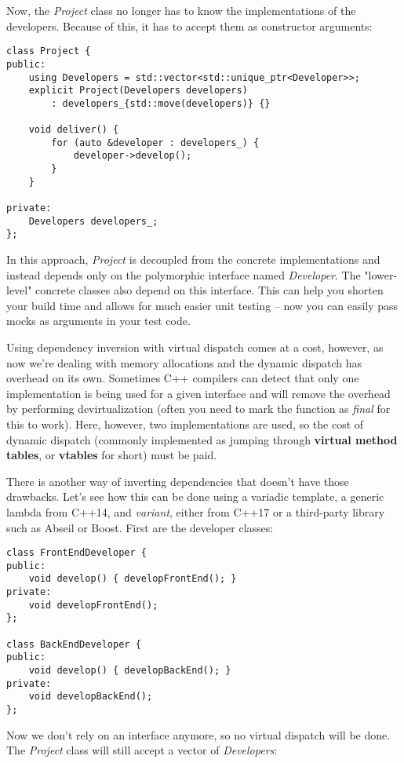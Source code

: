Now, the \textit{Project} class no longer has to know the implementations of the developers. Because of this, it has to accept them as constructor arguments:


\begin{lstlisting}[style=styleCXX]
class Project {
public:
	using Developers = std::vector<std::unique_ptr<Developer>>;
	explicit Project(Developers developers)
		: developers_{std::move(developers)} {}
		
	void deliver() {
		for (auto &developer : developers_) {
			developer->develop();
		}
	}

private:
	Developers developers_;
};
\end{lstlisting}

In this approach, \textit{Project} is decoupled from the concrete implementations and instead depends only on the polymorphic interface named \textit{Developer}. The "lower-level" concrete classes also depend on this interface. This can help you shorten your build time and allows for much easier unit testing – now you can easily pass mocks as arguments in your test code.

Using dependency inversion with virtual dispatch comes at a cost, however, as now we're dealing with memory allocations and the dynamic dispatch has overhead on its own. Sometimes C++ compilers can detect that only one implementation is being used for a given interface and will remove the overhead by performing devirtualization (often you need to mark the function as \textit{final} for this to work). Here, however, two implementations are used, so the cost of dynamic dispatch (commonly implemented as jumping through \textbf{virtual method tables}, or \textbf{vtables} for short) must be paid.

There is another way of inverting dependencies that doesn't have those drawbacks. Let's see how this can be done using a variadic template, a generic lambda from C++14, and \textit{variant}, either from C++17 or a third-party library such as Abseil or Boost. First are the developer classes:


\begin{lstlisting}[style=styleCXX]
class FrontEndDeveloper {
public:
	void develop() { developFrontEnd(); }
private:
	void developFrontEnd();
};

class BackEndDeveloper {
public:
	void develop() { developBackEnd(); }
private:
	void developBackEnd();
};
\end{lstlisting}

Now we don't rely on an interface anymore, so no virtual dispatch will be done. The \textit{Project} class will still accept a vector of \textit{Developers}:


